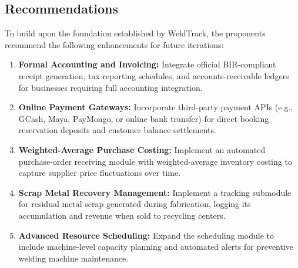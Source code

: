 \documentclass[12pt, letterpaper]{article}
\begin{document}
\subsection{Recommendations}
\hspace*{2em} To build upon the foundation established by WeldTrack, the proponents recommend the following enhancements for future iterations:
\begin{enumerate}[label=\alph*.]
    \item \textbf{Formal Accounting and Invoicing:} Integrate official BIR-compliant receipt generation, tax reporting schedules, and accounts-receivable ledgers for businesses requiring full accounting integration.
    \item \textbf{Online Payment Gateways:} Incorporate third-party payment APIs (e.g., GCash, Maya, PayMongo, or online bank transfer) for direct booking reservation deposits and customer balance settlements.
    \item \textbf{Weighted-Average Purchase Costing:} Implement an automated purchase-order receiving module with weighted-average inventory costing to capture supplier price fluctuations over time.
    \item \textbf{Scrap Metal Recovery Management:} Implement a tracking submodule for residual metal scrap generated during fabrication, logging its accumulation and revenue when sold to recycling centers.
    \item \textbf{Advanced Resource Scheduling:} Expand the scheduling module to include machine-level capacity planning and automated alerts for preventive welding machine maintenance.
\end{enumerate}
\end{document}
